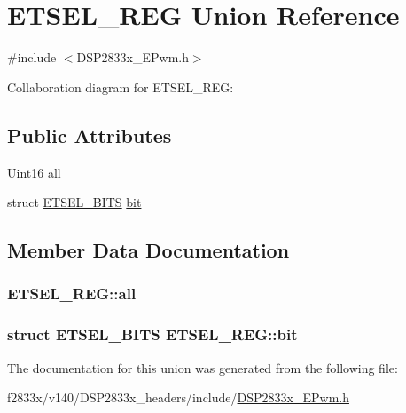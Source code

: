 \hypertarget{union_e_t_s_e_l___r_e_g}{}\section{E\+T\+S\+E\+L\+\_\+\+R\+E\+G Union Reference}
\label{union_e_t_s_e_l___r_e_g}


{\ttfamily \#include $<$D\+S\+P2833x\+\_\+\+E\+Pwm.\+h$>$}



Collaboration diagram for E\+T\+S\+E\+L\+\_\+\+R\+E\+G\+:
\subsection*{Public Attributes}
\begin{DoxyCompactItemize}
\item 
\hyperlink{_d_s_p2833x___device_8h_a59a9f6be4562c327cbfb4f7e8e18f08b}{Uint16} \hyperlink{union_e_t_s_e_l___r_e_g_a82af3b7514fcf2b77fc70580e5c59b3d}{all}
\item 
struct \hyperlink{struct_e_t_s_e_l___b_i_t_s}{E\+T\+S\+E\+L\+\_\+\+B\+I\+T\+S} \hyperlink{union_e_t_s_e_l___r_e_g_a60cd535719d537bb4eecd39561b0b90f}{bit}
\end{DoxyCompactItemize}


\subsection{Member Data Documentation}
\hypertarget{union_e_t_s_e_l___r_e_g_a82af3b7514fcf2b77fc70580e5c59b3d}{}
\subsubsection[{all}]{ E\+T\+S\+E\+L\+\_\+\+R\+E\+G\+::all}\label{union_e_t_s_e_l___r_e_g_a82af3b7514fcf2b77fc70580e5c59b3d}
\hypertarget{union_e_t_s_e_l___r_e_g_a60cd535719d537bb4eecd39561b0b90f}{}
\subsubsection[{bit}]{\setlength{\rightskip}{0pt plus 5cm}struct {\bf E\+T\+S\+E\+L\+\_\+\+B\+I\+T\+S} E\+T\+S\+E\+L\+\_\+\+R\+E\+G\+::bit}\label{union_e_t_s_e_l___r_e_g_a60cd535719d537bb4eecd39561b0b90f}


The documentation for this union was generated from the following file\+:\begin{DoxyCompactItemize}
\item 
f2833x/v140/\+D\+S\+P2833x\+\_\+headers/include/\hyperlink{_d_s_p2833x___e_pwm_8h}{D\+S\+P2833x\+\_\+\+E\+Pwm.\+h}\end{DoxyCompactItemize}
